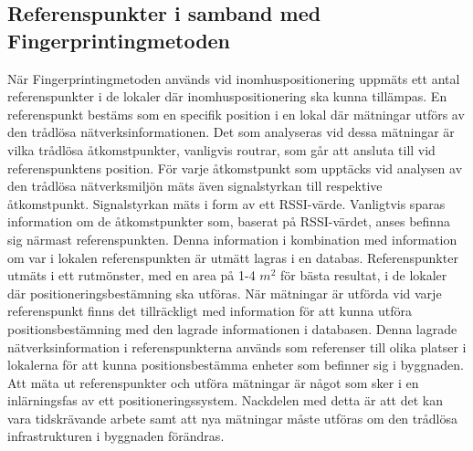 \documentclass[a4paper,12pt]{article}
\begin{document}
 \subsection{Referenspunkter i samband med Fingerprintingmetoden}\label{referenspunkter}
 När Fingerprintingmetoden används vid inomhuspositionering uppmäts ett antal referenspunkter i de lokaler där inomhuspositionering ska kunna tillämpas\cite{yiu2017wireless}\cite{IP1}.
 En referenspunkt bestäms som en specifik position i en lokal där mätningar utförs av den trådlösa nätverksinformationen. Det som analyseras vid dessa mätningar är vilka trådlösa åtkomstpunkter, vanligvis routrar, som går att ansluta till vid referenspunktens position. För varje åtkomstpunkt som upptäcks vid analysen av den trådlösa nätverksmiljön mäts även signalstyrkan till respektive åtkomstpunkt. Signalstyrkan mäts i form av ett RSSI-värde. Vanligtvis sparas information om de åtkomstpunkter som, baserat på RSSI-värdet, anses befinna sig närmast referenspunkten\cite{IP1}. Denna information i kombination med information om var i lokalen referenspunkten är utmätt lagras i en databas. Referenspunkter utmäts i ett rutmönster, med en area på 1-4 $m^2$ för bästa resultat\cite{yiu2017wireless}, i de lokaler där positioneringsbestämning ska utföras\cite{IP1}. När mätningar är utförda vid varje referenspunkt finns det tillräckligt med information för att kunna utföra positionsbestämning med den lagrade informationen i databasen. Denna lagrade nätverksinformation i referenspunkterna används som referenser till olika platser i lokalerna för att kunna positionsbestämma enheter som befinner sig i byggnaden\cite{yiu2017wireless}\cite{IP1}.
 Att mäta ut referenspunkter och utföra mätningar är något som sker i en inlärningsfas av ett positioneringssystem\cite{tian2013fingerprint}. Nackdelen med detta är att det kan vara tidskrävande arbete samt att nya mätningar måste utföras om den trådlösa infrastrukturen i byggnaden förändras\cite{IP1}.
\end{document}

